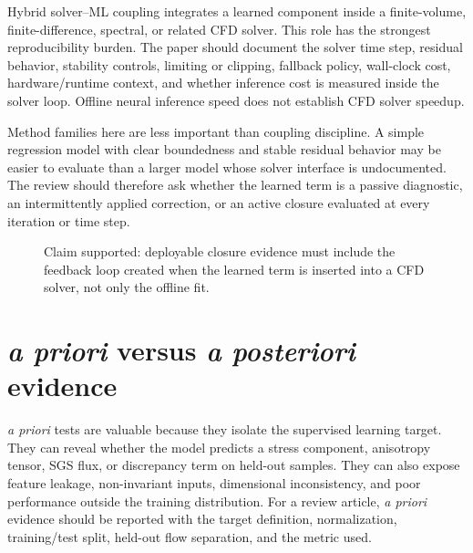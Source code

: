 \documentclass[11pt]{article}
\newcommand{\apriori}{\textit{a priori}}
\newcommand{\aposteriori}{\textit{a posteriori}}
\begin{document}
Hybrid solver--ML coupling integrates a learned component inside a finite-volume, finite-difference, spectral, or related CFD solver. This role has the strongest reproducibility burden. The paper should document the solver time step, residual behavior, stability controls, limiting or clipping, fallback policy, wall-clock cost, hardware/runtime context, and whether inference cost is measured inside the solver loop. Offline neural inference speed does not establish CFD solver speedup.

Method families here are less important than coupling discipline. A simple regression model with clear boundedness and stable residual behavior may be easier to evaluate than a larger model whose solver interface is undocumented. The review should therefore ask whether the learned term is a passive diagnostic, an intermittently applied correction, or an active closure evaluated at every iteration or time step.

\begin{figure}[t]
\centering
{}
\caption{Claim supported: deployable closure evidence must include the feedback loop created when the learned term is inserted into a CFD solver, not only the offline fit.}
\label{fig:coupling-loop}
\end{figure}

\section{\texorpdfstring{\apriori{} versus \aposteriori{}}{A priori versus a posteriori} evidence}

\apriori{} tests are valuable because they isolate the supervised learning target. They can reveal whether the model predicts a stress component, anisotropy tensor, SGS flux, or discrepancy term on held-out samples. They can also expose feature leakage, non-invariant inputs, dimensional inconsistency, and poor performance outside the training distribution. For a review article, \apriori{} evidence should be reported with the target definition, normalization, training/test split, held-out flow separation, and the metric used.
\end{document}
